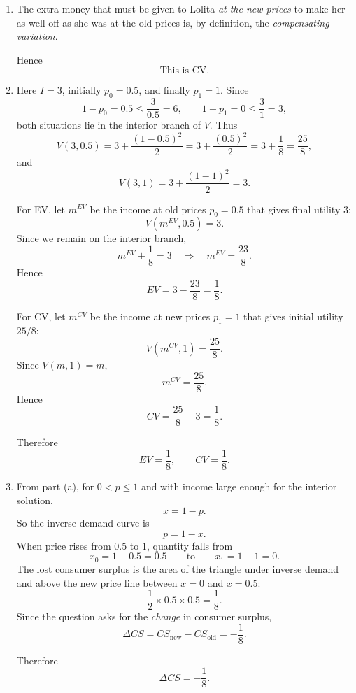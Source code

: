 \documentclass[12pt]{article}
\begin{document}
\begin{enumerate}[label=(\alph*)]
    Hence
    \[
    \boxed{\text{This is EV.}}
    \]

    \item
    The extra money that must be given to Lolita \emph{at the new prices} to make her as well-off as she was at the old prices is, by definition, the \emph{compensating variation}.

    Hence
    \[
    \boxed{\text{This is CV.}}
    \]

    \item
    Here \(I=3\), initially \(p_0=0.5\), and finally \(p_1=1\). Since
    \[
    1-p_0=0.5\le \frac{3}{0.5}=6,
    \qquad
    1-p_1=0\le \frac{3}{1}=3,
    \]
    both situations lie in the interior branch of \(V\). Thus
    \[
    V(3,0.5)=3+\frac{(1-0.5)^2}{2}
    =3+\frac{(0.5)^2}{2}
    =3+\frac18
    =\frac{25}{8},
    \]
    and
    \[
    V(3,1)=3+\frac{(1-1)^2}{2}=3.
    \]

    For EV, let \(m^{EV}\) be the income at old prices \(p_0=0.5\) that gives final utility \(3\):
    \[
    V(m^{EV},0.5)=3.
    \]
    Since we remain on the interior branch,
    \[
    m^{EV}+\frac18=3
    \quad\Longrightarrow\quad
    m^{EV}=\frac{23}{8}.
    \]
    Hence
    \[
    EV=3-\frac{23}{8}=\frac18.
    \]

    For CV, let \(m^{CV}\) be the income at new prices \(p_1=1\) that gives initial utility \(25/8\):
    \[
    V(m^{CV},1)=\frac{25}{8}.
    \]
    Since \(V(m,1)=m\),
    \[
    m^{CV}=\frac{25}{8}.
    \]
    Hence
    \[
    CV=\frac{25}{8}-3=\frac18.
    \]

    Therefore
    \[
    \boxed{EV=\frac18,\qquad CV=\frac18.}
    \]

    \item
    From part (a), for \(0<p\le 1\) and with income large enough for the interior solution,
    \[
    x=1-p.
    \]
    So the inverse demand curve is
    \[
    p=1-x.
    \]
    When price rises from \(0.5\) to \(1\), quantity falls from
    \[
    x_0=1-0.5=0.5
    \qquad\text{to}\qquad
    x_1=1-1=0.
    \]
    The lost consumer surplus is the area of the triangle under inverse demand and above the new price line between \(x=0\) and \(x=0.5\):
    \[
    \frac12 \times 0.5 \times 0.5=\frac18.
    \]
    Since the question asks for the \emph{change} in consumer surplus,
    \[
    \Delta CS=CS_{\text{new}}-CS_{\text{old}}=-\frac18.
    \]

    Therefore
    \[
    \boxed{\Delta CS=-\frac18.}
    \]
\end{enumerate}
\end{document}
